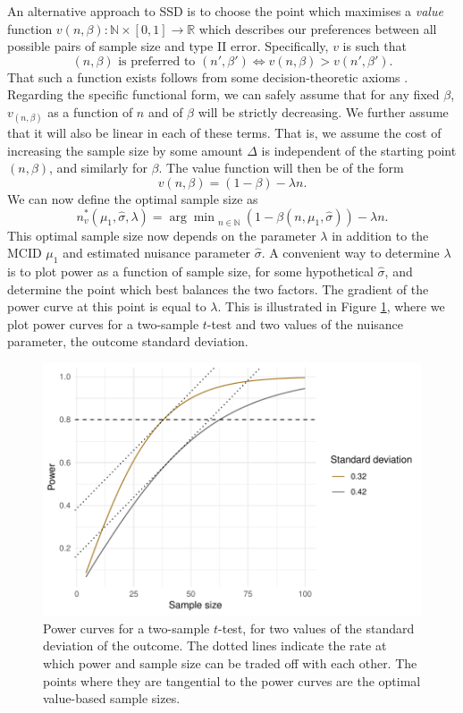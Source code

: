 \documentclass[sagev, Crown]{sagej}
\begin{document}
An alternative approach to SSD is to choose the point which maximises a \emph{value} function $v(n, \beta): \mathbb{N} \times [0,1] \rightarrow \mathbb{R}$ which describes our preferences between all possible pairs of sample size and type II error. Specifically, $v$ is such that
$$
(n, \beta) \text{ is preferred to }(n', \beta') \Leftrightarrow v(n, \beta) > v(n', \beta').
$$
That such a function exists follows from some decision-theoretic axioms \cite{French2000}. Regarding the specific functional form, we can safely assume that for any fixed $\beta$, $v_(n, \beta)$ as a function of $n$ and of $\beta$ will be strictly decreasing. We further assume that it will also be linear in each of these terms. That is, we assume the cost of increasing the sample size by some amount $\Delta$ is independent of the starting point $(n, \beta)$, and similarly for $\beta$. The value function will then be of the form
$$
v(n, \beta) = (1 - \beta) - \lambda n.
$$
We can now define the optimal sample size as
\begin{equation}
n^*_v (\mu_1, \hat{\sigma}, \lambda) = {\arg\min}_{n \in \mathbb{N}} ~ (1 - \beta(n, \mu_1, \hat{\sigma})) - \lambda n.
\end{equation}
This optimal sample size now depends on the parameter $\lambda$ in addition to the MCID $\mu_1$ and estimated nuisance parameter $\hat{\sigma}$. A convenient way to determine $\lambda$ is to plot power as a function of sample size, for some hypothetical $\hat{\sigma}$, and determine the point which best balances the two factors. The gradient of the power curve at this point is equal to $\lambda$. This is illustrated in Figure \ref{fig:p_curves}, where we plot power curves for a two-sample $t$-test and two values of the nuisance parameter, the outcome standard deviation. 

\begin{figure}
\centering
\includegraphics[scale=0.8]{./figures/p_curves}
\caption{Power curves for a two-sample $t$-test, for two values of the standard deviation of the outcome. The dotted lines indicate the rate at which power and sample size can be traded off with each other. The points where they are tangential to the power curves are the optimal value-based sample sizes.}
\label{fig:p_curves}
\end{figure}
\end{document}

